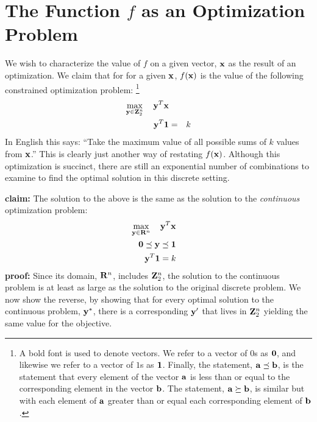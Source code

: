 \documentclass[12pt]{article}
\begin{document}
\section{The Function $f$ as an Optimization Problem}
We wish to characterize the value of $f$ on a given vector, ${\bf x}$ as 
the result of an optimization.
We claim that for for a given ${\bf x}$, $f({\bf x})$ is the value of 
the following constrained optimization problem:%
\footnote{A bold font is used to denote vectors. We refer to a  
vector of $0$s as ${\bf 0}$, and likewise we refer to a vector of $1$s
as ${\bf 1}$. Finally, the statement, ${\bf a} \preceq {\bf b}$, is the 
statement that every element of the vector ${\bf a}$ is less than or equal
to the corresponding element in the vector ${\bf b}$. The statement,
${\bf a} \succeq {\bf b}$, is similar but with each element of ${\bf a}$
greater than or equal each corresponding element of ${\bf b}$.
}
\begin{eqnarray}
\mathop{\rm max}_{{\bf y} \in {\bf Z}_2^n}\limits \quad {\bf y}^T {\bf x} && \\
{\bf y}^T {\bf 1} & = & k 
\end{eqnarray}
In English this says: ``Take the maximum value of all possible sums of $k$ 
values from ${\bf x}$.'' This is clearly just another way of restating $f({\bf x})$.
Although this optimization is succinct, there are still an exponential number 
of combinations to examine to find the optimal solution in this discrete setting.

{\bf claim:} The solution to the above is the same as the solution to the 
{\it continuous\/} optimization problem: 
\begin{eqnarray}
\mathop{\rm max}_{{\bf y} \in {\bf R}^n}\limits \quad {\bf y}^T {\bf x} &&  \\
{\bf 0} \preceq {\bf y}   \preceq  {\bf 1}&& \\ 
{\bf y}^T {\bf 1}  =  k && \label{integral} 
\end{eqnarray}
{\bf proof:}
Since its domain, ${\bf R}^n$, 
includes ${\bf Z}_2^n$, the solution to the continuous problem is at least as 
large as the solution to the original discrete problem.
We now show the reverse, by showing that for every optimal solution to the 
continuous problem, ${\bf y}^*$, there is a corresponding ${\bf y}^\prime$ that 
lives in ${\bf Z}_2^n$ yielding the same value for the objective.
\end{document}
